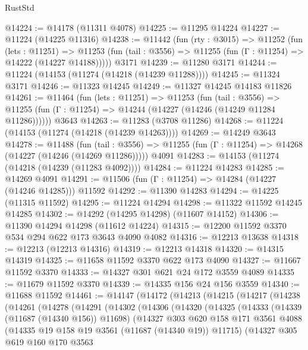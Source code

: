 \begin{lexlean}{RustStd}
\begin{coremodule}
@14224 := @14178 (@11311 @4078)
@14225 := @11295 @14224
@14227 := @11224 (@14225 @11316)
@14238 := @11442
    (fun (rty : @3015) =>
    @11252
      (fun (lets : @11251) =>
      @11253 (fun (tail : @3556) => @11255 (fun (Γ : @11254) => @14222 (@14227 @14188)))))
    @3171
@14239 := @11280 @3171
@14244 := @11224 (@14153 (@11274 (@14218 (@14239 @11288))))
@14245 := @11324 @3171
@14246 := @11323 @14245
@14249 := @11327 @14245 @14183 @11826
@14261 := @11464
    (fun (lets : @11251) =>
    @11253
      (fun (tail : @3556) =>
      @11255 (fun (Γ : @11254) => @14244 (@14227 (@14246 (@14249 @11284 @11286))))))
    @3643
@14263 := @11283 (@3708 @11286)
@14268 := @11224 (@14153 (@11274 (@14218 (@14239 @14263))))
@14269 := @14249 @3643
@14278 := @11488
    (fun (tail : @3556) => @11255 (fun (Γ : @11254) => @14268 (@14227 (@14246 (@14269 @11286)))))
    @4091
@14283 := @14153 (@11274 (@14218 (@14239 (@11283 @4092))))
@14284 := @11224 @14283
@14285 := @14269 @4091
@14291 := @11506 (fun (Γ : @11254) => @14284 (@14227 (@14246 @14285))) @11592
@14292 := @11390 @14283
@14294 := @14225 (@11315 @11592)
@14295 := @11224 @14294
@14298 := @11322 @11592 @14245 @14285
@14302 := @14292 (@14295 @14298) (@11607 @14152)
@14306 := @11390 @14294 @14298 (@11612 @14224)
@14315 := @12200 @11592 @3370 @534 @294 @622 @173 @3643 @4090 @4082
@14316 := @12213 @13638
@14318 := @12213 (@12213 @14316)
@14319 := @12213 @14318
@14320 := @14315 @14319
@14325 := @11658 @11592 @3370 @622 @173 @4090
@14327 := @11667 @11592 @3370
@14333 := @14327 @301 @621 @24 @172 @3559 @4089
@14335 := @11679 @11592 @3370
@14339 := @14335 @156 @24 @156 @3559
@14340 := @11688 @11592
@14461 := @14147
    (@14172
      (@14213
        (@14215
          (@14217
            (@14238
              (@14261
                (@14278
                  (@14291
                    (@14302
                      (@14306
                        (@14320
                          (@14325
                            (@14333
                              (@14339 (@11687 (@14340 @156)) @11698)
                              (@14327
                                @303
                                @620
                                @158
                                @171
                                @3561
                                @4088
                                (@14335 @19 @158 @19 @3561 (@11687 (@14340 @19)) @11715)
                                (@14327
                                  @305
                                  @619
                                  @160
                                  @170
                                  @3563

\end{coremodule}
\end{lexlean}
